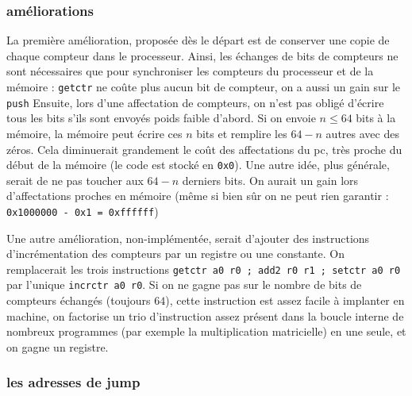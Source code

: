 \documentclass[architecture]{compas2018}
\begin{document}
\subsubsection{améliorations}
La première amélioration, proposée dès le départ est de conserver une copie de chaque compteur dans le processeur. Ainsi, les échanges de bits de compteurs ne sont nécessaires que pour synchroniser les compteurs du processeur et de la mémoire : \texttt{getctr} ne coûte plus aucun bit de compteur, on a aussi un gain sur le \texttt{push}
Ensuite, lors d'une affectation de compteurs, on n'est pas obligé d'écrire tous les bits s'ils sont envoyés poids faible d'abord. Si on envoie $n\leqslant 64$ bits à la mémoire, la mémoire peut écrire ces $n$ bits et remplire les $64-n$ autres avec des zéros. Cela diminuerait grandement le coût des affectations du pc, très proche du début de la mémoire (le code est stocké en \texttt{0x0}). Une autre idée, plus générale, serait de ne pas toucher aux $64-n$ derniers bits. On aurait un gain lors d'affectations proches en mémoire (même si bien sûr on ne peut rien garantir : \texttt{0x1000000 - 0x1 = 0xffffff})\par
Une autre amélioration, non-implémentée, serait d'ajouter des instructions d'incrémentation des compteurs par un registre ou une constante. On remplacerait les trois instructions \texttt{getctr a0 r0 ; add2 r0 r1 ; setctr a0 r0} par l'unique \texttt{incrctr a0 r0}. Si on ne gagne pas sur le nombre de bits de compteurs échangés (toujours $64$), cette instruction est assez facile à implanter en machine, on factorise un trio d'instruction assez présent dans la boucle interne de nombreux programmes (par exemple la multiplication matricielle) en une seule, et on gagne un registre.

\subsubsection{les adresses de jump}
\end{document}

